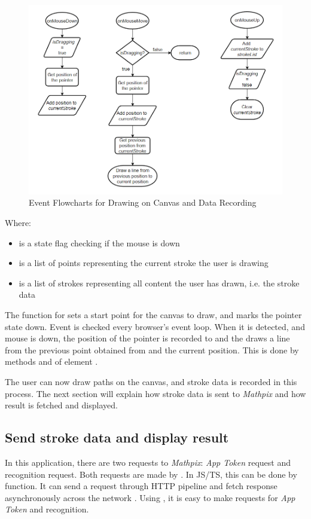 \documentclass[12pt,twoside]{report}
\begin{document}
\begin{figure}[h]
    \centering
    \includegraphics[width=\linewidth, frame]{figures/flowchart-op1.png}
    \caption{Event Flowcharts for Drawing on Canvas and Data Recording}
    \label{fig:flowchart1}
\end{figure}
Where:
\begin{itemize}
    \item {} is a state flag checking if the mouse is down
    \item {} is a list of points representing the current stroke the user is drawing
    \item {} is a list of strokes representing all content the user has drawn, i.e. the stroke data
\end{itemize}

The function for  sets a start point for the canvas to draw,
and marks the pointer state down. Event  is checked every
browser's event loop. When it is detected, and mouse is down, the position of
the pointer is recorded to  and the  draws a
line from the previous point obtained from  and the current
position. This is done by methods  and
 of element . 

The user can now draw paths on the canvas, and stroke data is recorded in this process. The next section will explain how stroke data is sent to \textit{Mathpix} and how result is fetched and displayed.

\subsection{Send stroke data and display result}
In this application, there are two requests to \textit{Mathpix}: \textit{App Token} request and recognition request. Both requests are made by . In JS/TS, this can be done by  function. It can send a request through HTTP pipeline and fetch response asynchronously across the network \cite{web:fetchapi}. Using , it is easy to make requests for \textit{App Token} and recognition.
\end{document}

